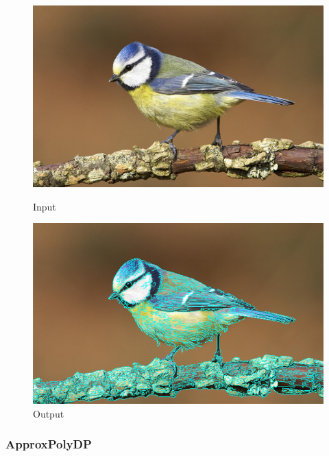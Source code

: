 \begin{figure}[htb]
    \centering
    \begin{minipage}[t]{0.45\linewidth}
        \centering
        \includegraphics[width=\linewidth]{pics/bildverarbeitungsalgos/input.png}
        \caption{Input \cite{maai:input:cite}}
        \label{maai:getcounturs:input}
    \end{minipage}
    \hfill
    \begin{minipage}[t]{0.45\linewidth}
        \centering
        \includegraphics[width=\linewidth]{pics/bildverarbeitungsalgos/getcounturs_output.png}
        \caption{Output}
        \label{maai:getcounturs:output}
    \end{minipage}
\end{figure}

\subsubsection{ApproxPolyDP}\label{maai:approxpolydp:header}

